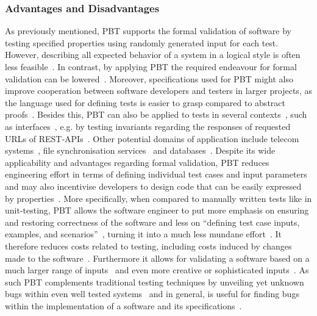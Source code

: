 \documentclass[runningheads]{llncs}
\begin{document}
\subsubsection{Advantages and Disadvantages}
As previously mentioned, PBT supports the formal validation of software by testing specified properties using randomly generated input for each test. However, describing all expected behavior of a system in a logical style is often less feasible~\cite{Chen2022,Koopman2012}. In contrast, by applying PBT the required endeavour for formal validation can be lowered~\cite{Hritcu2016,Chen2022,Paraskevopoulou2015}. Moreover, specifications used for PBT might also improve cooperation between software developers and testers in larger projects, as the language used for defining tests is easier to grasp compared to abstract proofs~\cite{Chen2022,Loescher2017}. Besides this, PBT can also be applied to tests in several contexts~\cite{Karlsson2019}, such as interfaces~\cite{Karlsson2019,Francisco2013,LamelaSeijas2013}, e.g. by testing invariants regarding the responses of requested URLs of REST-APIs~\cite{Karlsson2019}. Other potential domains of application include telecom systems~\cite{Arts2006}, file synchronisation services~\cite{Hughes2016} and databases~\cite{Arts2015}. Despite its wide applicability and advantages regarding formal validation, PBT reduces engineering effort in terms of defining individual test cases and input parameters~\cite{Chen2022,Loescher2017,Corgozinho2023} and may also incentivise developers to design code that can be easily expressed by properties~\cite{Chen2022}. More specifically, when compared to manually written tests like in unit-testing, PBT allows the software engineer to put more emphasis on ensuring and restoring correctness of the software and less on ``defining test case inputs, examples, and scenarios''~\cite{Corgozinho2023}, turning it into a much less mundane effort~\cite{Loescher2017}. It therefore reduces costs related to testing, including costs induced by changes made to the software~\cite{Chen2022,Loescher2017}. Furthermore it allows for validating a software based on a much larger range of inputs~\cite{Loescher2017,Corgozinho2023} and even more creative or sophisticated inputs~\cite{Arts2015}. As such PBT complements traditional testing techniques by unveiling yet unknown bugs within even well tested systems~\cite{Arts2015,Hughes2016,Arts2006} and in general, is useful for finding bugs within the implementation of a software and its specifications~\cite{Chen2022,Fink1997,Loescher2017,Paraskevopoulou2015,Claessen2000,Corgozinho2023}.
\end{document}
